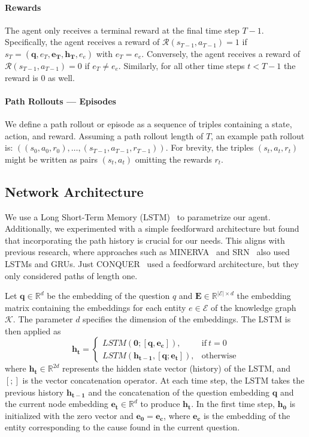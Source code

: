 \paragraph{Rewards}
The agent only receives a terminal reward at the final time step $T-1$. 
Specifically, the agent receives a reward of $\mathcal{R}(s_{T-1}, a_{T-1}) = 1$ if $s_T = (\mathbf{q}, e_T, \mathbf{e_T}, \mathbf{h_T}, e_e)$ with 
$e_T = e_e$. Conversely,
the agent receives a reward of $\mathcal{R}(s_{T-1}, a_{T-1}) =0$ if $e_T \neq e_e$. Similarly, for all other 
time steps $t < T -1$ the reward is $0$ as well. 

\paragraph{Path Rollouts --- Episodes}
We define a path rollout or episode as a sequence of triples containing a state, action, and reward. Assuming a path rollout length of $T$, an example path rollout is: $((s_0, a_0, r_0),\dots, (s_{T-1}, a_{T-1}, r_{T-1}))$. For brevity, the triples $(s_t, a_t, r_t)$ might be written as pairs $(s_t, a_t)$ omitting the rewards $r_t$.


\subsection{Network Architecture}
\label{subsec:network}
We use a Long Short-Term Memory (LSTM)~\cite{Hochreiter1997LSTM} to parametrize our agent. Additionally, we experimented with a simple feedforward architecture but found that incorporating the path history is crucial for our needs. This aligns with previous research, where approaches such as MINERVA~\cite{Das2018Minerva} and SRN~\cite{Qiu2020Stepwise} also used LSTMs and GRUs. Just CONQUER~\cite{Kaiser2021Reinforcement} used a feedforward architecture, but they only considered paths of length one.

Let $\mathbf{q} \in \mathbb{R}^d$ be the embedding of the question $q$ and $\mathbf{E} \in \mathbb{R}^{|\mathcal{E}| \times d}$ the embedding matrix containing the embeddings for each entity $e \in \mathcal{E}$ of the knowledge graph $\mathcal{K}$. The parameter $d$ specifies the dimension of the embeddings. The LSTM is then applied as 
\begin{equation}
	\mathbf{h_t}=
    \begin{cases}
      LSTM(\mathbf{0}; [\mathbf{q}, \mathbf{e_c}]), & \text{if}\ t=0 \\
      LSTM(\mathbf{h_{t-1}}, [\mathbf{q}; \mathbf{e_t}]), & \text{otherwise}
    \end{cases}
\end{equation}
where $\mathbf{h_t} \in \mathbb{R}^{2d}$ represents the hidden state vector (history) of the LSTM, and $[;]$ is the vector concatenation operator. At each time step, the LSTM takes the previous history $\mathbf{h_{t-1}}$ and the concatenation of the question embedding $\mathbf{q}$ and the current node embedding $\mathbf{e_t} \in \mathbb{R}^{d}$ to produce $\mathbf{h_t}$. In the first time step, $\mathbf{h_0}$ is initialized with the zero vector and $\mathbf{e_0} = \mathbf{e_c}$, where $\mathbf{e_c}$ is the embedding of the entity corresponding to the cause found in the current question.

